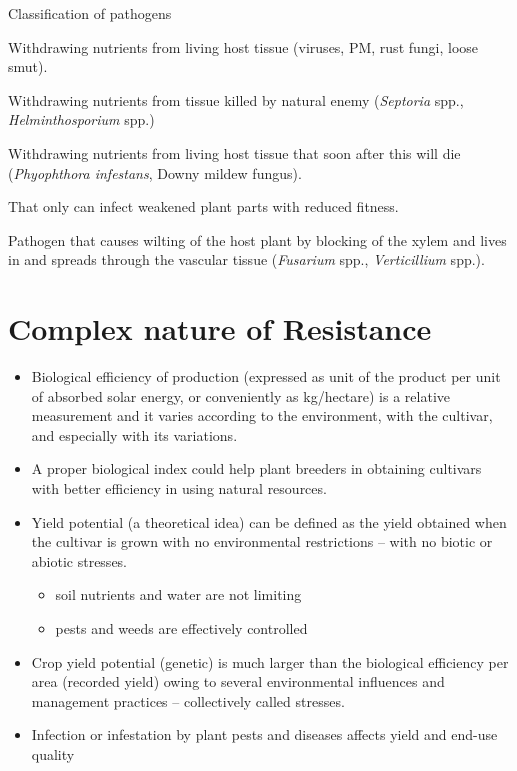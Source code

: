\documentclass[11pt,dvipsnames,ignorenonframetext,aspectratio=169]{beamer}
\providecommand{\tightlist}{%
  \setlength{\itemsep}{0pt}\setlength{\parskip}{0pt}}
\begin{document}
\begin{frame}{Classification of pathogens}
\protect\hypertarget{classification-of-pathogens}{}
\begin{description}
\small
\item[Biotrophs] Withdrawing nutrients from living host tissue (viruses, PM, rust fungi, loose smut).
\item[Necrotrophs] Withdrawing nutrients from tissue killed by natural enemy (\textit{Septoria} spp., \textit{Helminthosporium} spp.)
\item[Hemi-biotrophs] Withdrawing nutrients from living host tissue that soon after this will die (\textit{Phyophthora infestans}, Downy mildew fungus).
\item[Weakness pathogen] That only can infect weakened plant parts with reduced fitness.
\item[Vascular wilts] Pathogen that causes wilting of the host plant by blocking of the xylem and lives in and spreads through the vascular tissue (\textit{Fusarium} spp., \textit{Verticillium} spp.).
\end{description}
\end{frame}

\hypertarget{complex-nature-of-resistance}{%
\section{Complex nature of
Resistance}\label{complex-nature-of-resistance}}

\begin{frame}{}
\protect\hypertarget{section-2}{}
\small

\begin{itemize}
\tightlist
\item
  Biological efficiency of production (expressed as unit of the product
  per unit of absorbed solar energy, or conveniently as kg/hectare) is a
  relative measurement and it varies according to the environment, with
  the cultivar, and especially with its variations.
\item
  A proper biological index could help plant breeders in obtaining
  cultivars with better efficiency in using natural resources.
\item
  Yield potential (a theoretical idea) can be defined as the yield
  obtained when the cultivar is grown with no environmental restrictions
  -- with no biotic or abiotic stresses.

  \begin{itemize}
  \tightlist
  \item
    soil nutrients and water are not limiting
  \item
    pests and weeds are effectively controlled
  \end{itemize}
\item
  Crop yield potential (genetic) is much larger than the biological
  efficiency per area (recorded yield) owing to several environmental
  influences and management practices -- collectively called
  \alert{stresses}.
\item
  Infection or infestation by plant pests and diseases affects
  \alert{yield} and \alert{end-use quality}
\end{itemize}
\end{frame}
\end{document}
